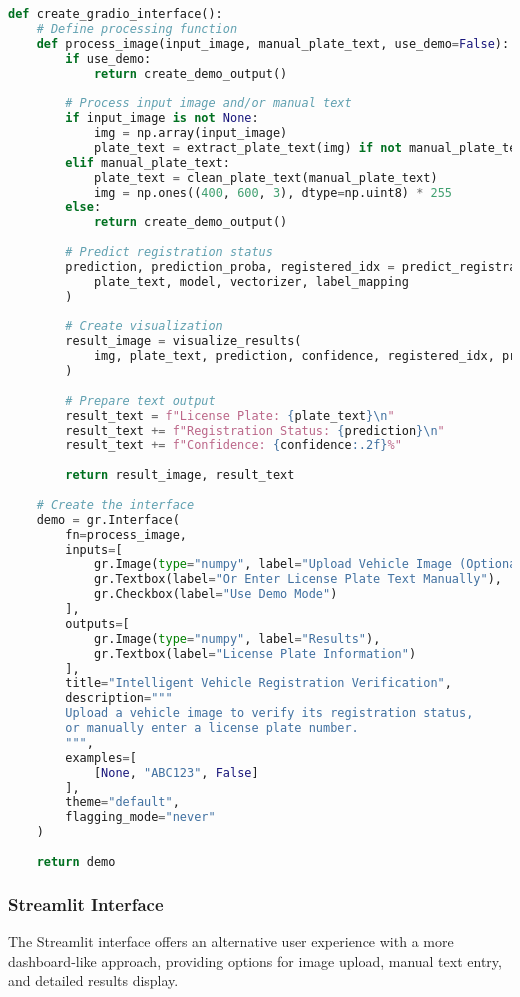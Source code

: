 \documentclass[conference]{IEEEtran}
\begin{document}
\begin{lstlisting}[language=Python, caption=Gradio Interface Implementation]
def create_gradio_interface():
    # Define processing function
    def process_image(input_image, manual_plate_text, use_demo=False):
        if use_demo:
            return create_demo_output()
            
        # Process input image and/or manual text
        if input_image is not None:
            img = np.array(input_image)
            plate_text = extract_plate_text(img) if not manual_plate_text else manual_plate_text
        elif manual_plate_text:
            plate_text = clean_plate_text(manual_plate_text)
            img = np.ones((400, 600, 3), dtype=np.uint8) * 255
        else:
            return create_demo_output()
            
        # Predict registration status
        prediction, prediction_proba, registered_idx = predict_registration(
            plate_text, model, vectorizer, label_mapping
        )
        
        # Create visualization
        result_image = visualize_results(
            img, plate_text, prediction, confidence, registered_idx, prediction_proba
        )
        
        # Prepare text output
        result_text = f"License Plate: {plate_text}\n"
        result_text += f"Registration Status: {prediction}\n"
        result_text += f"Confidence: {confidence:.2f}%"
        
        return result_image, result_text
    
    # Create the interface
    demo = gr.Interface(
        fn=process_image,
        inputs=[
            gr.Image(type="numpy", label="Upload Vehicle Image (Optional)"),
            gr.Textbox(label="Or Enter License Plate Text Manually"),
            gr.Checkbox(label="Use Demo Mode")
        ],
        outputs=[
            gr.Image(type="numpy", label="Results"),
            gr.Textbox(label="License Plate Information")
        ],
        title="Intelligent Vehicle Registration Verification",
        description="""
        Upload a vehicle image to verify its registration status,
        or manually enter a license plate number.
        """,
        examples=[
            [None, "ABC123", False]
        ],
        theme="default",
        flagging_mode="never"
    )
    
    return demo
\end{lstlisting}

\subsubsection{Streamlit Interface}
The Streamlit interface offers an alternative user experience with a more dashboard-like approach, providing options for image upload, manual text entry, and detailed results display.
\end{document}
